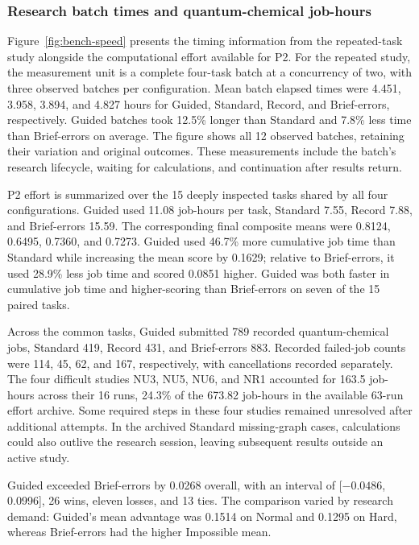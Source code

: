 \subsubsection{Research batch times and quantum-chemical job-hours}

Figure~\ref{fig:bench-speed} presents the timing information from the repeated-task study alongside the computational effort available for P2. For the repeated study, the measurement unit is a complete four-task batch at a concurrency of two, with three observed batches per configuration. Mean batch elapsed times were 4.451, 3.958, 3.894, and 4.827 hours for Guided, Standard, Record, and Brief-errors, respectively. Guided batches took 12.5\% longer than Standard and 7.8\% less time than Brief-errors on average. The figure shows all 12 observed batches, retaining their variation and original outcomes. These measurements include the batch's research lifecycle, waiting for calculations, and continuation after results return.

P2 effort is summarized over the 15 deeply inspected tasks shared by all four configurations. Guided used 11.08 job-hours per task, Standard 7.55, Record 7.88, and Brief-errors 15.59. The corresponding final composite means were 0.8124, 0.6495, 0.7360, and 0.7273. Guided used 46.7\% more cumulative job time than Standard while increasing the mean score by 0.1629; relative to Brief-errors, it used 28.9\% less job time and scored 0.0851 higher. Guided was both faster in cumulative job time and higher-scoring than Brief-errors on seven of the 15 paired tasks.

Across the common tasks, Guided submitted 789 recorded quantum-chemical jobs, Standard 419, Record 431, and Brief-errors 883. Recorded failed-job counts were 114, 45, 62, and 167, respectively, with cancellations recorded separately. The four difficult studies NU3, NU5, NU6, and NR1 accounted for 163.5 job-hours across their 16 runs, 24.3\% of the 673.82 job-hours in the available 63-run effort archive. Some required steps in these four studies remained unresolved after additional attempts. In the archived Standard missing-graph cases, calculations could also outlive the research session, leaving subsequent results outside an active study.

Guided exceeded Brief-errors by 0.0268 overall, with an interval of [$-0.0486$, 0.0996], 26 wins, eleven losses, and 13 ties. The comparison varied by research demand: Guided's mean advantage was 0.1514 on Normal and 0.1295 on Hard, whereas Brief-errors had the higher Impossible mean.

